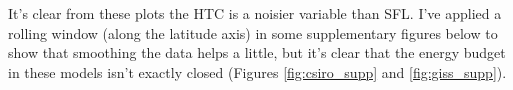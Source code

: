 It's clear from these plots the HTC is a noisier variable than SFL. I've applied a rolling window (along the latitude axis) in some supplementary figures below to show that smoothing the data helps a little, but it's clear that the energy budget in these models isn't exactly closed (Figures \ref{fig:csiro_supp} and \ref{fig:giss_supp}).